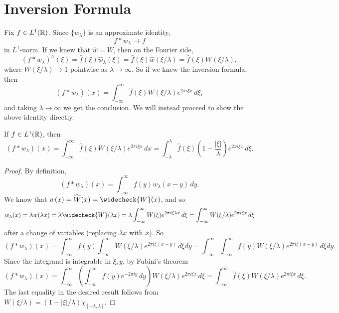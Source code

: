 \section{Inversion Formula}

\begin{remark}
  Fix $f \in L^1(\mathbb{R})$. Since $\{w_\lambda\}$
  is an approximate identity,
  \[
    f * w_\lambda \longrightarrow f
  \]
  in $L^1$-norm. If we knew that
  $\widehat{w} = W$, then on the Fourier side,
  \[
    (f * w_\lambda)^\wedge(\xi)
    = \widehat{f}(\xi) \widehat{w}_\lambda(\xi)
    = \widehat{f}(\xi) \widehat{w}(\xi / \lambda)
    = \widehat{f}(\xi) W(\xi / \lambda),
  \]
  where $W(\xi / \lambda) \to 1$ pointwise as
  $\lambda \to \infty$.
  So if we knew the inversion formula, then
  \[
    (f * w_\lambda)(x)
    = \int_{-\infty}^\infty \widehat{f}(\xi) W(\xi / \lambda) e^{2\pi i \xi x}\, d\xi,
  \]
  and taking $\lambda \to \infty$ we get the conclusion.
  We will instead proceed to show the above identity
  directly.
\end{remark}

\begin{theorem}
  If $f \in L^1(\mathbb{R})$, then
  \[
    (f * w_\lambda)(x)
    = \int_{-\infty}^\infty \widehat{f}(\xi) W(\xi / \lambda) e^{2\pi i \xi x}\, dx
    = \int_{-\lambda}^\lambda \widehat{f}(\xi) \left(1 - \frac{|\xi|}{\lambda}\right) e^{2\pi i \xi x}\, d\xi.
  \]
\end{theorem}

\begin{proof}
  By definition,
  \[
    (f * w_\lambda)(x) = \int_{-\infty}^\infty f(y) w_\lambda(x - y)\, dy.
  \]
  We know that $w(x) = \widehat{W}(x) = \widecheck{W}(x)$,
  and so
  \[
    w_\lambda(x)
    = \lambda w(\lambda x)
    = \lambda \widecheck{W}(\lambda x)
    = \lambda \int_{-\infty}^\infty W(\xi) e^{2\pi i \xi \lambda x}\, d\xi
    = \int_{-\infty}^\infty W(\xi / \lambda) e^{2\pi i \xi x}\, d\xi
  \]
  after a change of variables (replacing
  $\lambda x$ with $x$). So
  \[
    (f * w_\lambda)(x)
    = \int_{-\infty}^\infty f(y) \int_{-\infty}^\infty W(\xi / \lambda) e^{2\pi i \xi (x - y)}\, d\xi dy
    = \int_{-\infty}^\infty \int_{-\infty}^\infty f(y) W(\xi / \lambda) e^{2\pi i \xi (x - y)}\, d\xi dy.
  \]
  Since the integrand is integrable in $\xi, y$, by
  Fubini's theorem
  \[
    (f * w_\lambda)(x)
    = \int_{-\infty}^\infty \left(\int_{-\infty}^\infty f(y) e^{-2\pi iy}\, dy\right) W(\xi / \lambda) e^{2\pi i \xi x}\, d\xi
    = \int_{-\infty}^\infty \widehat{f}(\xi) W(\xi / \lambda) e^{2\pi i \xi x}\, d\xi.
  \]
  The last equality in the desired result follows from
  $W(\xi / \lambda) = (1 - |\xi| / \lambda) \chi_{[-\lambda, \lambda]}$.
\end{proof}

